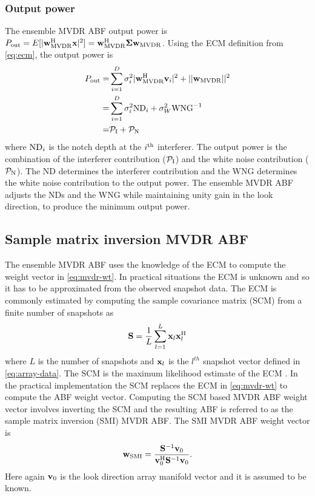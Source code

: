 \subsubsection*{Output power}
\label{sec:output-power}
The ensemble MVDR ABF output power is $P_{\rm out} = E[|{\bf w}_{\rm MVDR}^{\rm H}{\bf x}|^2] = {\bf w}_{\rm MVDR}^{\rm H}\boldsymbol{\Sigma}{\bf w}_{\rm MVDR}$. Using the ECM definition from \eqref{eq:ecm}, the output power is
\begin{align}
  \label{eq:mvdr-ecm-pout}
  P_{\rm out} =& \sum\limits_{i=1}^D\sigma_i^2|{\bf w}_{\rm MVDR}^{\rm H}{\bf v}_i|^2 + ||{\bf w}_{\rm MVDR}||^2  \nonumber \\
=& \sum\limits_{i=1}^D\sigma_i^2\text{ND}_i + \sigma^2_W\text{WNG}^{-1} \nonumber \\
=& \mathcal{P}_{\rm I}{} + \mathcal{P}_{\rm N}{}
\end{align}
where $\text{ND}_i$ is the notch depth at the $i^{\rm th}$
interferer. The output power is the combination of the interferer
contribution ($\mathcal{P}_{\rm I}$) and the white noise contribution
($\mathcal{P}_{\rm N}$). The ND determines the interferer contribution and the WNG
determines the white noise contribution to the output power. The
ensemble MVDR ABF adjusts the NDs and the WNG while maintaining unity
gain in the look direction, to produce the minimum output power.

\subsection{Sample matrix inversion MVDR ABF}
\label{sec:smi-mvdr}
The ensemble MVDR ABF uses the knowledge of the ECM to compute the
weight vector in \eqref{eq:mvdr-wt}. In practical situations the ECM
is unknown and so it has to be approximated from the observed snapshot
data. The ECM is commonly estimated by computing the sample covariance
matrix (SCM) from a finite number of snapshots as
\[ 
{\bf S} = \frac{1}{L}\sum\limits_{l=1}^{L}{\bf x}_l{\bf x}_l^{\rm H}
\]
where $L$ is the number of snapshots and ${\bf x}_l$ is the
$l^{th}$ snapshot vector defined in \eqref{eq:array-data}. The SCM is
the maximum likelihood estimate of the ECM
\cite[Sec. 7.2.1]{vtree2002oap}. In the practical implementation the SCM replaces the ECM in \eqref{eq:mvdr-wt} to compute the ABF weight vector. Computing
the SCM based MVDR ABF weight vector involves inverting the SCM and
the resulting ABF is referred to as the sample matrix inversion (SMI)
MVDR ABF. The SMI MVDR ABF weight vector is
\begin{equation*}
  \label{eq:smi-wt}
  {\bf w}_{\rm SMI} = \frac{{\bf S}^{-1}{\bf v}_0}{{\bf v}_0^{\rm H}{\bf S}^{-1}{\bf v}_0} .
\end{equation*}
Here again ${\bf v}_0$ is the look direction array manifold vector and it is assumed to be known. 

